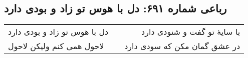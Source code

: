 \begin{center}
\section*{رباعی شماره ۶۹۱: دل با هوس تو زاد و بودی دارد}
\label{sec:0691}
\begin{longtable}{l p{0.5cm} r}
دل با هوس تو زاد و بودی دارد
&&
با سایهٔ تو گفت و شنودی دارد
\\
لاحول همی کنم ولیکن لاحول
&&
در عشق گمان مکن که سودی دارد
\\
\end{longtable}
\end{center}
